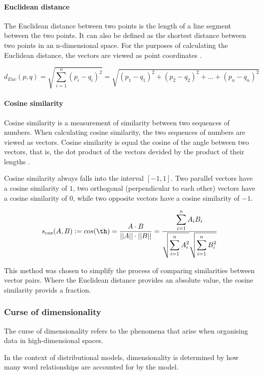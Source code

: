 \documentclass[14pt, a4paper]{extreport}
\begin{document}
\paragraph{Euclidean distance}

The Euclidean distance between two points is the length of a line segment between the two points. It can also be defined as the shortest distance between two points in an n-dimensional space. For the purposes of calculating the Euclidean distance, the vectors are viewed as point coordinates \parencite{oduntan}.

\medskip
\[d_{Euc}(p, q) = \sqrt{\displaystyle\sum_{i=1}^{n} (p_i - q_i)^2} = \sqrt{(p_1 - q_1)^2 + (p_2 - q_2)^2 + ... + (p_n - q_n)^2}\]

\paragraph{Cosine similarity}

Cosine similarity is a measurement of similarity between two sequences of numbers. When calculating cosine similarity, the two sequences of numbers are viewed as vectors. Cosine similarity is equal the cosine of the angle between two vectors, that is, the dot product of the vectors devided by the product of their lengths \parencite{oduntan}.

Cosine similarity always falls into the interval \([-1, 1]\). Two parallel vectors have 
a cosine similarity of \(1\), two orthogonal (perpendicular to each other) vectors have a cosine similarity of \(0\), while two opposite vectors have a cosine similarity of \(-1\).

\medskip
\[s_{cos}(A, B) := cos(\th) = \frac {A \cdot B}{||A|| \cdot ||B||} = \frac {\displaystyle\sum_{i=1}^{n} A_i B_i}{\sqrt{\displaystyle\sum_{i=1}^{n} A_i^2} \sqrt{\displaystyle\sum_{i=1}^{n} B_i^2}}\]
\medskip

This method was chosen to simplify the process of comparing similarities between vector pairs. Where the Euclidean distance provides an absolute value, the cosine similarity provids a fraction.


\subsubsection{Curse of dimensionality}
The curse of dimensionality refers to the phenomena that arise when organising data in high-dimensional spaces.

In the context of distributional models, dimensionality is determined by how many word relationships are accounted for by the model.
\end{document}

